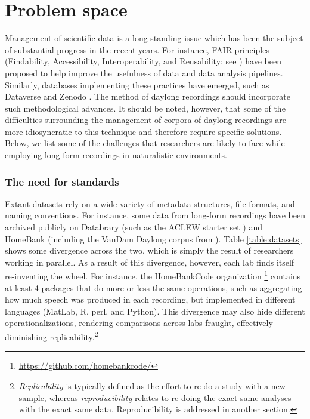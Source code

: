 \documentclass[smallextended]{svjour3}       %
\begin{document}
\section{Problem space}\label{section:problemspace}

Management of scientific data is a long-standing issue which has been the subject of substantial progress in the recent years. For instance, FAIR principles (Findability, Accessibility, Interoperability, and Reusability; see \citealt{Wilkinson2016}) have been proposed to help improve the usefulness of data and data analysis pipelines. Similarly, databases implementing these practices have emerged, such as Dataverse \citep{dataverse} and Zenodo \citep{zenodo}. The method of daylong recordings should incorporate such methodological advances. It should be noted, however, that some of the difficulties surrounding the management of corpora of daylong recordings are more idiosyncratic to this technique and therefore require specific solutions. Below, we list some of the challenges that researchers are likely to face while employing long-form recordings in naturalistic environments.

\subsubsection*{The need for standards}

Extant datasets rely on a wide variety of metadata structures, file formats, and naming conventions. For instance, some data from long-form recordings have been archived publicly on Databrary (such as the ACLEW starter set \citep{starter}) and HomeBank (including the VanDam Daylong corpus from \citealt{vandam-day}). Table \ref{table:datasets} shows some divergence across the two, which is simply the result of researchers working in parallel. As a result of this divergence, however, each lab finds itself re-inventing the wheel. For instance, the HomeBankCode organization \footnote{\url{https://github.com/homebankcode/}} contains at least 4 packages that do more or less the same operations, such as aggregating how much speech was produced in each recording, but implemented in different languages (MatLab,  R, perl, and Python). This divergence may also hide different operationalizations, rendering comparisons across labs fraught, effectively diminishing replicability.\footnote{\textit{Replicability} is typically defined as the effort to re-do a study with a new sample, whereas \textit{reproducibility} relates to re-doing the exact same analyses with the exact same data. Reproducibility is addressed in another section.} 
\end{document}
